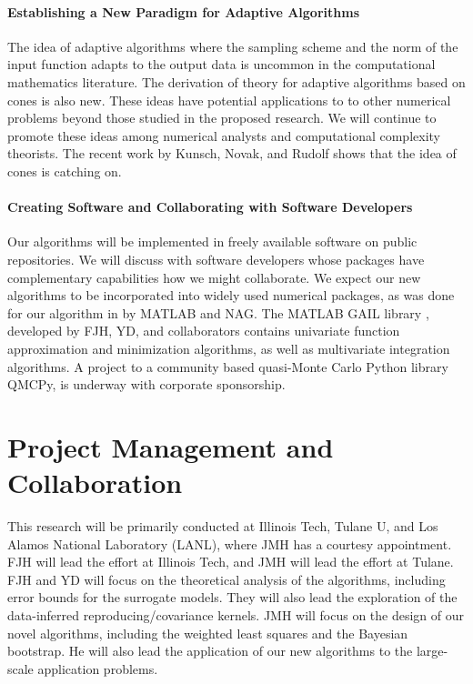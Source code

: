 \documentclass[11pt]{NSFamsart}
\newcommand{\GAIL}{GAIL\xspace}
\newcommand{\NAG}{NAG\xspace}
\newcommand{\MATLAB}{MATLAB\xspace}
\begin{document}
\paragraph*{Establishing a New Paradigm for Adaptive Algorithms} 
The idea of adaptive algorithms where the sampling scheme and the norm of the input function adapts to the output data is uncommon in the computational mathematics literature.  The derivation of theory for adaptive algorithms based on cones is also new.  These ideas have potential applications to to other numerical problems beyond those studied in the proposed research.  We will continue to promote these ideas among numerical analysts and computational complexity theorists.  The recent work by Kunsch, Novak, and Rudolf \cite{KunEtal19a} shows that the idea of cones is catching on.

\paragraph*{Creating Software and Collaborating with Software Developers}
Our algorithms will be implemented in freely available software on public repositories.  We will discuss with software developers whose packages have complementary capabilities how we might collaborate. We expect our new algorithms to be incorporated into widely used numerical packages, as was done for our algorithm in \cite{HonHic00a} by \MATLAB and \NAG.  The \MATLAB \GAIL library \citep{ChoEtal19a}, developed by FJH, YD, and collaborators contains univariate function approximation and minimization algorithms, as well as multivariate integration algorithms.  A project to a community based quasi-Monte Carlo Python library QMCPy, is underway with corporate sponsorship.  

\section{Project Management and Collaboration}
This research will be primarily conducted at Illinois Tech, Tulane U, and Los Alamos National Laboratory (LANL), where JMH has a courtesy appointment.  FJH will lead the effort at Illinois Tech, and JMH will lead the effort at Tulane.  FJH and YD will focus on the theoretical analysis of the algorithms, including error bounds for the surrogate models.  They will also lead the exploration of the data-inferred reproducing/covariance kernels.  JMH will focus on the design of our novel algorithms, including the weighted least squares and the Bayesian bootstrap.  He will also lead the application of our new algorithms to the large-scale application problems.  
\end{document}
